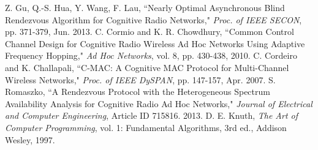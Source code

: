 \documentclass[journal]{IEEEtran}
\begin{document}
\begin{thebibliography}{1}
Z. Gu, Q.-S. Hua, Y. Wang, F. Lau, ``Nearly Optimal Asynchronous Blind Rendezvous Algorithm for Cognitive Radio Networks," \emph{Proc. of IEEE SECON}, pp. 371-379, Jun. 2013.
C. Cormio and K. R. Chowdhury, ``Common Control Channel Design for Cognitive Radio Wireless Ad Hoc Networks Using Adaptive Frequency Hopping," \emph{Ad Hoc Networks}, vol. 8, pp. 430-438, 2010.
C. Cordeiro and K. Challapali, ``C-MAC: A Cognitive MAC Protocol for Multi-Channel Wireless Networks," \emph{Proc. of IEEE DySPAN}, pp. 147-157, Apr. 2007.
S. Romaszko, ``A Rendezvous Protocol with the Heterogeneous Spectrum Availability Analysis for Cognitive Radio Ad Hoc Networks," \emph{Journal of Electrical and Computer Engineering}, Article ID 715816. 2013.
D. E. Knuth, \emph{The Art of Computer Programming}, vol. 1: Fundamental Algorithms, 3rd ed., Addison Wesley, 1997.






\end{thebibliography}
\end{document}
